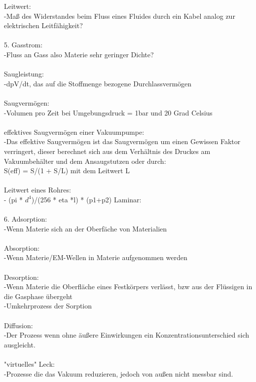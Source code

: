 	   Leitwert:\\
		-Maß des Widerstandes beim Fluss eines Fluides durch ein Kabel analog zur elektrischen Leitfähigkeit?\\ 
\\
	5. Gasstrom: \\
		-Fluss an Gass also Materie sehr geringer Dichte?\\
\\
	   Saugleistung:\\
		-dpV/dt, das auf die Stoffmenge bezogene Durchlassvermögen\\
\\
	   Saugvermögen:\\
	   	-Volumen pro Zeit bei Umgebungsdruck = 1bar und 20 Grad Celsius\\
\\
	   effektives Saugvermögen einer Vakuumpumpe:\\
	   	-Das effektive Saugvermögen ist das Saugvermögen um einen Gewissen Faktor verringert, dieser berechnet sich aus dem Verhältnis des Druckes am Vakuumbehälter und dem Ansaugstutzen oder durch:\\
			S(eff) = S/(1 + S/L) mit dem Leitwert L\\
\\
	   Leitwert eines Rohres:\\
		- (pi * $d^4$)/(256 * eta *l) * (p1+p2) Laminar:\\
\\
	6. Adsorption:\\
		-Wenn Materie sich an der Oberfäche von Materialien \\ 
\\
	   Absorption:\\
		-Wenn Materie/EM-Wellen in Materie aufgenommen werden\\
\\
	   Desorption:\\
		-Wenn Materie die Oberfläche eines Festkörpers verlässt, bzw aus der Flüssigen in die Gasphase übergeht\\
		-Umkehrprozess der Sorption\\
\\
	   Diffusion:\\
		-Der Prozess wenn ohne äußere Einwirkungen ein Konzentrationsunterschied sich ausgleicht.\\
		\\
	   "virtuelles" Leck:\\
	   	-Prozesse die das Vakuum reduzieren, jedoch von außen nicht messbar sind.\\
